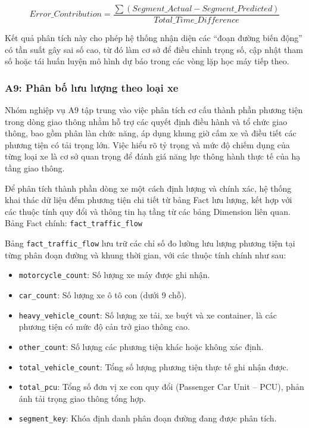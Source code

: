 \[
Error\_Contribution =
\frac{\sum (Segment\_Actual - Segment\_Predicted)}
{Total\_Time\_Difference}
\]

Kết quả phân tích này cho phép hệ thống nhận diện các ``đoạn đường biến động'' có tần suất gây sai số cao, từ đó làm cơ sở để điều chỉnh trọng số, cập nhật tham số hoặc tái huấn luyện mô hình dự báo trong các vòng lặp học máy tiếp theo.

\subsubsection{A9: Phân bố lưu lượng theo loại xe}

Nhóm nghiệp vụ A9 tập trung vào việc phân tích cơ cấu thành phần phương tiện trong dòng giao thông nhằm hỗ trợ các quyết định điều hành và tổ chức giao thông, bao gồm phân làn chức năng, áp dụng khung giờ cấm xe và điều tiết các phương tiện có tải trọng lớn. Việc hiểu rõ tỷ trọng và mức độ chiếm dụng của từng loại xe là cơ sở quan trọng để đánh giá năng lực thông hành thực tế của hạ tầng giao thông.


Để phân tích thành phần dòng xe một cách định lượng và chính xác, hệ thống khai thác dữ liệu đếm phương tiện chi tiết từ bảng Fact lưu lượng, kết hợp với các thuộc tính quy đổi và thông tin hạ tầng từ các bảng Dimension liên quan.\\

Bảng Fact chính: \texttt{fact\_traffic\_flow}

Bảng \texttt{fact\_traffic\_flow} lưu trữ các chỉ số đo lường lưu lượng phương tiện tại từng phân đoạn đường và khung thời gian, với các thuộc tính chính như sau:

\begin{itemize}
    \item \texttt{motorcycle\_count}: Số lượng xe máy được ghi nhận.
    \item \texttt{car\_count}: Số lượng xe ô tô con (dưới 9 chỗ).
    \item \texttt{heavy\_vehicle\_count}: Số lượng xe tải, xe buýt và xe container, là các phương tiện có mức độ cản trở giao thông cao.
    \item \texttt{other\_count}: Số lượng các phương tiện khác hoặc không xác định.
    \item \texttt{total\_vehicle\_count}: Tổng số lượng phương tiện thực tế ghi nhận được.
    \item \texttt{total\_pcu}: Tổng số đơn vị xe con quy đổi (Passenger Car Unit -- PCU), phản ánh tải trọng giao thông tổng hợp.
    \item \texttt{segment\_key}: Khóa định danh phân đoạn đường đang được phân tích.
\end{itemize}

